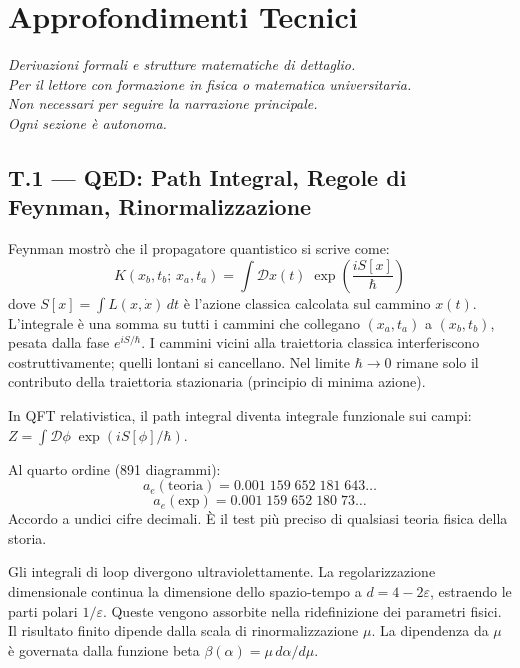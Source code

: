 \documentclass[12pt,a4paper,openany]{book}
\newcommand{\sezione}[1]{\vspace{1.2em}{\large\bfseries #1}\vspace{0.5em}\par}
\begin{document}
\part*{Approfondimenti Tecnici}

\begin{center}
\itshape
Derivazioni formali e strutture matematiche di dettaglio.\\
Per il lettore con formazione in fisica o matematica universitaria.\\
Non necessari per seguire la narrazione principale.\\
Ogni sezione è autonoma.
\end{center}
\clearpage

\chapter*{T.1 — QED: Path Integral, Regole di Feynman, Rinormalizzazione}

\sezione{Il propagatore come integrale sui cammini}

Feynman mostrò che il propagatore quantistico si scrive come:
\[
K(x_b,t_b;\,x_a,t_a) = \int \mathcal{D}x(t)\;\exp\!\left(\frac{iS[x]}{\hbar}\right)
\]
dove $S[x] = \int L(x,\dot{x})\,dt$ è l'azione classica calcolata sul cammino $x(t)$. L'integrale è una somma su tutti i cammini che collegano $(x_a,t_a)$ a $(x_b,t_b)$, pesata dalla fase $e^{iS/\hbar}$. I cammini vicini alla traiettoria classica interferiscono costruttivamente; quelli lontani si cancellano. Nel limite $\hbar \to 0$ rimane solo il contributo della traiettoria stazionaria (principio di minima azione).

In QFT relativistica, il path integral diventa integrale funzionale sui campi: $Z = \int \mathcal{D}\phi\;\exp(iS[\phi]/\hbar)$.

\sezione{Il momento magnetico anomalo}

Al quarto ordine (891 diagrammi):
\[
a_e(\text{teoria}) = 0.001\;159\;652\;181\;643\ldots
\]
\[
a_e(\text{exp}) = 0.001\;159\;652\;180\;73\ldots
\]
Accordo a undici cifre decimali. È il test più preciso di qualsiasi teoria fisica della storia.

\sezione{Rinormalizzazione}

Gli integrali di loop divergono ultraviolettamente. La regolarizzazione dimensionale continua la dimensione dello spazio-tempo a $d = 4 - 2\varepsilon$, estraendo le parti polari $1/\varepsilon$. Queste vengono assorbite nella ridefinizione dei parametri fisici. Il risultato finito dipende dalla scala di rinormalizzazione $\mu$. La dipendenza da $\mu$ è governata dalla funzione beta $\beta(\alpha) = \mu\,d\alpha/d\mu$.
\end{document}
